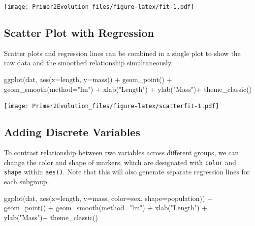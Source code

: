 \documentclass[
]{book}
\newenvironment{Shaded}{\begin{snugshade}}{\end{snugshade}}
\newcommand{\AttributeTok}[1]{\textcolor[rgb]{0.77,0.63,0.00}{#1}}
\newcommand{\FunctionTok}[1]{\textcolor[rgb]{0.00,0.00,0.00}{#1}}
\newcommand{\NormalTok}[1]{#1}
\newcommand{\SpecialCharTok}[1]{\textcolor[rgb]{0.00,0.00,0.00}{#1}}
\newcommand{\StringTok}[1]{\textcolor[rgb]{0.31,0.60,0.02}{#1}}
\begin{document}
\texttt{[image: Primer2Evolution\_files/figure-latex/fit-1.pdf]}

\hypertarget{scatter-plot-with-regression}{%
\subsection{Scatter Plot with Regression}\label{scatter-plot-with-regression}}

Scatter plots and regression lines can be combined in a single plot to show the raw data and the smoothed relationship simultaneously.

\begin{Shaded}
\begin{Highlighting}[]
\FunctionTok{ggplot}\NormalTok{(dat, }\FunctionTok{aes}\NormalTok{(}\AttributeTok{x=}\NormalTok{length, }\AttributeTok{y=}\NormalTok{mass)) }\SpecialCharTok{+}
    \FunctionTok{geom\_point}\NormalTok{() }\SpecialCharTok{+}
    \FunctionTok{geom\_smooth}\NormalTok{(}\AttributeTok{method=}\StringTok{"lm"}\NormalTok{) }\SpecialCharTok{+}
    \FunctionTok{xlab}\NormalTok{(}\StringTok{"Length"}\NormalTok{) }\SpecialCharTok{+}
    \FunctionTok{ylab}\NormalTok{(}\StringTok{"Mass"}\NormalTok{)}\SpecialCharTok{+}
    \FunctionTok{theme\_classic}\NormalTok{()}
\end{Highlighting}
\end{Shaded}

\texttt{[image: Primer2Evolution\_files/figure-latex/scatterfit-1.pdf]}

\hypertarget{adding-discrete-variables}{%
\subsection{Adding Discrete Variables}\label{adding-discrete-variables}}

To contrast relationship between two variables across different groups, we can change the color and shape of markers, which are designated with \texttt{color} and \texttt{shape} within \texttt{aes()}. Note that this will also generate separate regression lines for each subgroup.

\begin{Shaded}
\begin{Highlighting}[]
\FunctionTok{ggplot}\NormalTok{(dat, }\FunctionTok{aes}\NormalTok{(}\AttributeTok{x=}\NormalTok{length, }\AttributeTok{y=}\NormalTok{mass, }\AttributeTok{color=}\NormalTok{sex, }\AttributeTok{shape=}\NormalTok{population)) }\SpecialCharTok{+}
    \FunctionTok{geom\_point}\NormalTok{() }\SpecialCharTok{+}
    \FunctionTok{geom\_smooth}\NormalTok{(}\AttributeTok{method=}\StringTok{"lm"}\NormalTok{) }\SpecialCharTok{+}
    \FunctionTok{xlab}\NormalTok{(}\StringTok{"Length"}\NormalTok{) }\SpecialCharTok{+}
    \FunctionTok{ylab}\NormalTok{(}\StringTok{"Mass"}\NormalTok{)}\SpecialCharTok{+}
    \FunctionTok{theme\_classic}\NormalTok{()}
\end{Highlighting}
\end{Shaded}
\end{document}
